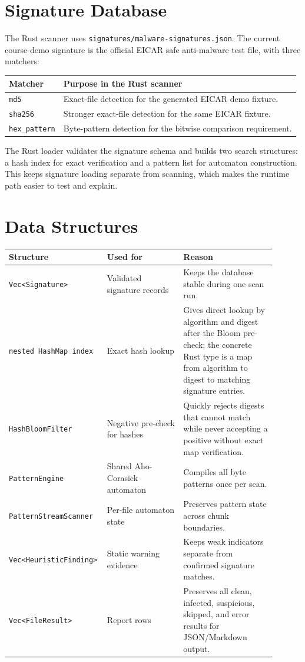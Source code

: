 \documentclass[11pt]{article}
\begin{document}
\section{Signature Database}

The Rust scanner uses \texttt{signatures/malware-signatures.json}. The current
course-demo signature is the official EICAR safe anti-malware test file, with
three matchers:

\begin{center}
\begin{tabular}{ll}
\toprule
\textbf{Matcher} & \textbf{Purpose in the Rust scanner} \\
\midrule
\texttt{md5} & Exact-file detection for the generated EICAR demo fixture. \\
\texttt{sha256} & Stronger exact-file detection for the same EICAR fixture. \\
\texttt{hex\_pattern} & Byte-pattern detection for the bitwise comparison requirement. \\
\bottomrule
\end{tabular}
\end{center}

The Rust loader validates the signature schema and builds two search structures:
a hash index for exact verification and a pattern list for automaton
construction. This keeps signature loading separate from scanning, which makes
the runtime path easier to test and explain.

\section{Data Structures}

\begin{longtable}{p{0.28\linewidth}p{0.28\linewidth}p{0.34\linewidth}}
\toprule
\textbf{Structure} & \textbf{Used for} & \textbf{Reason} \\
\midrule
\texttt{Vec<Signature>} & Validated signature records & Keeps the database
stable during one scan run. \\
\texttt{nested HashMap index} & Exact hash lookup & Gives direct lookup by
algorithm and digest after the Bloom pre-check; the concrete Rust type is a
map from algorithm to digest to matching signature entries. \\
\texttt{HashBloomFilter} & Negative pre-check for hashes & Quickly rejects
digests that cannot match while never accepting a positive without exact map
verification. \\
\texttt{PatternEngine} & Shared Aho-Corasick automaton & Compiles all byte
patterns once per scan. \\
\texttt{PatternStreamScanner} & Per-file automaton state & Preserves pattern
state across chunk boundaries. \\
\texttt{Vec<HeuristicFinding>} & Static warning evidence & Keeps weak
indicators separate from confirmed signature matches. \\
\texttt{Vec<FileResult>} & Report rows & Preserves all clean, infected,
suspicious, skipped, and error results for JSON/Markdown output. \\
\bottomrule
\end{longtable}
\end{document}
